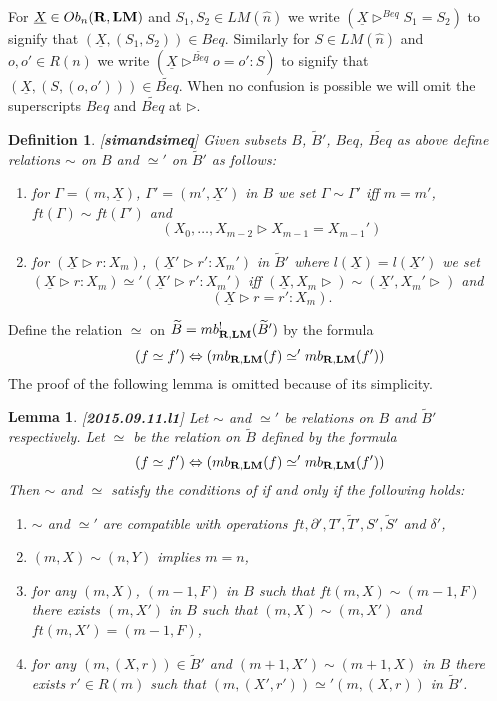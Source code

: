 \documentclass[11pt]{article}
\newtheorem{lemma}[proposition]{Lemma}
\newtheorem{definition}[proposition]{Definition}
\newcommand{\llabel}[1]{\label{#1}[{\bf #1}]}
\newcommand{\rr}{{\bf R}}
\newcommand{\lm}{{\bf LM}}
\newcommand{\uu}{\underline}
\newcommand{\wt}{\widetilde}
\newcommand{\wh}{\widehat}
\begin{document}
For $\uu{X}\in Ob_n(\rr,\lm)$ and $S_1,S_2\in LM(\wh{n})$ we write $(\uu{X}\rhd^{Beq} S_1=S_2)$ to signify that $(\uu{X},(S_1,S_2))\in Beq$. Similarly for $S\in LM(\wh{n})$ and $o,o'\in R(n)$ we write $(\uu{X}\rhd^{\wt{Beq}} o=o':S)$ to signify that $(\uu{X},(S,(o,o')))\in \wt{Beq}$.  When no confusion is possible we will omit the superscripts $Beq$ and $\wt{Beq}$ at $\rhd$. 
%
\begin{definition}
\llabel{simandsimeq}
Given subsets $B$, $\wt{B}'$, $Beq$, $\wt{Beq}$ as above define relations $\sim$ on $B$ and $\simeq'$ on $\wt{B}'$ as follows:
%
\begin{enumerate}
\item for $\Gamma=(m,\uu{X})$, $\Gamma'=(m',\uu{X}')$ in $B$ we set  $\Gamma\sim\Gamma'$ iff $m=m'$, $ft(\Gamma)\sim ft(\Gamma')$ and 
%
$$(X_0,\dots,X_{m-2}\rhd X_{m-1}=X_{m-1}')$$
%
\item for $(\uu{X}\rhd r:X_m)$, $(\uu{X}'\rhd r':X_m')$ in $\wt{B}'$ where $l(\uu{X})=l(\uu{X}')$ we set $(\uu{X}\rhd r:X_m)\simeq'(\uu{X}'\rhd r':X_m')$ iff $(\uu{X},X_m\rhd)\sim(\uu{X}',X_m'\rhd)$ and 
%
$$(\uu{X}\rhd r=r':X_m).$$
%
\end{enumerate}
\end{definition}
%
Define the relation $\simeq$ on $\wt{B}=mb_{\rr,\lm}^!(\wt{B}')$ by the formula
%
$$(f\simeq f')\Leftrightarrow (mb_{\rr,\lm}(f)\simeq' mb_{\rr,\lm}(f'))$$
%
The proof of the  following lemma is omitted because of its simplicity. 
%
\begin{lemma}
\llabel{2015.09.11.l1}
Let $\sim$ and $\simeq'$ be relations on $B$ and $\wt{B}'$ respectively. Let $\simeq$ be the relation on $\wt{B}$ defined by the formula
%
$$(f\simeq f')\Leftrightarrow (mb_{\rr,\lm}(f)\simeq' mb_{\rr,\lm}(f'))$$
%
Then $\sim$ and $\simeq$ satisfy the conditions of \cite[Proposition 5.4]{Csubsystems} if and only if the following holds:
%
\begin{enumerate}
\item $\sim$ and $\simeq'$ are compatible with operations $ft, \partial', T',\wt{T}', S', \wt{S}'$ and $\delta'$,
\item $(m,X)\sim (n,Y)$ implies $m=n$,
\item for any $(m,X)$, $(m-1,F)$ in $B$ such that $ft(m,X)\sim (m-1,F)$ there exists $(m,X')$ in $B$ such that $(m,X)\sim (m,X')$ and $ft(m,X')=(m-1,F)$, 
\item for any $(m,(X,r))\in \wt{B}'$ and $(m+1,X')\sim (m+1,X)$ in $B$ there exists $r'\in R(m)$ such that $(m,(X',r'))\simeq'(m,(X,r))$ in $\wt{B}'$.
\end{enumerate}
\end{lemma}
\end{document}
